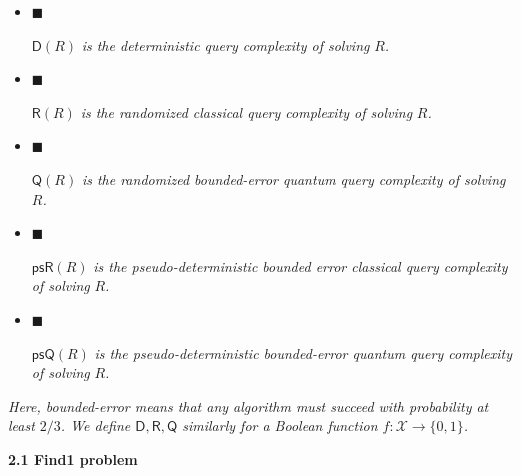 \documentclass[10pt,a4paper]{article}
\begin{document}
\begin{itemize}


\item[] 
$\blacksquare$ 


$\mathsf{D}({R})$\emph{ is the deterministic query complexity of solving }${R}$\emph{.}\par





\item[] 
$\blacksquare$ 


$\mathsf{R}({R})$\emph{ is the randomized classical query complexity of solving }${R}$\emph{.}\par





\item[] 
$\blacksquare$ 


$\mathsf{Q}({R})$\emph{ is the randomized bounded-error quantum query complexity of solving }${R}$\emph{.}\par





\item[] 
$\blacksquare$ 


$\mathsf{psR}(R)$\emph{ is the pseudo-deterministic bounded error classical query complexity of solving }${R}$\emph{.}\par





\item[] 
$\blacksquare$ 


$\mathsf{psQ}({R})$\emph{ is the pseudo-deterministic bounded-error quantum query complexity of solving }${R}$\emph{.}\par





\end{itemize}


\emph{Here, bounded-error means that any algorithm must succeed with probability at least $2/3$. We define $\mathsf{D},\mathsf{R},\mathsf{Q}$ similarly for a Boolean function $f:\mathcal{X}\rightarrow\{0,1\}$.}\par






\par\medskip\noindent\textbf{
2.1 Find1 problem}\par
\end{document}
